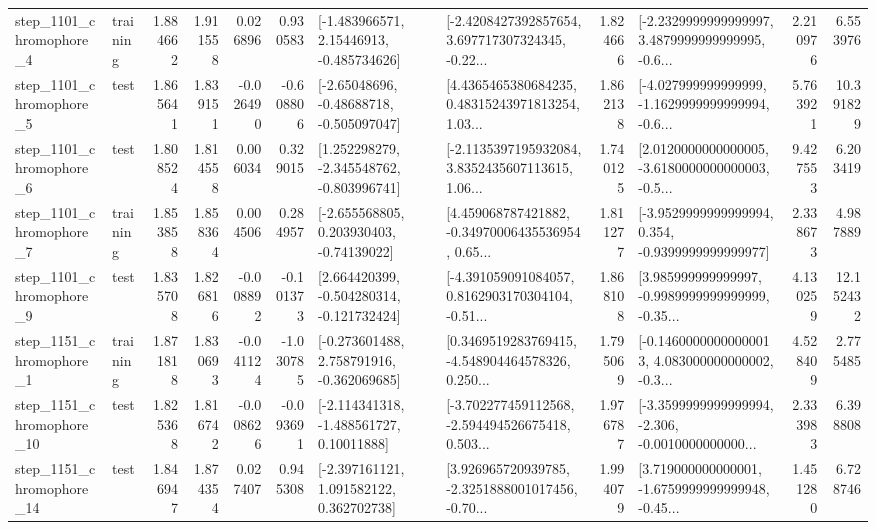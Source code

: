 \begin{tabular}{llrrrrllrlrr}
  step\_1101\_chromophore\_4 &  training &      1.884662 &    1.911558 &      0.026896 &  0.930583 &    [-1.483966571, 2.15446913, -0.485734626] &  [-2.4208427392857654, 3.697717307324345, -0.22... &       1.824666 &  [-2.2329999999999997, 3.4879999999999995, -0.6... &            2.210976 &          6.553976 \\
  step\_1101\_chromophore\_5 &      test &      1.865641 &    1.839151 &     -0.026490 & -0.608806 &    [-2.65048696, -0.48688718, -0.505097047] &  [4.4365465380684235, 0.48315243971813254, 1.03... &       1.862138 &  [-4.027999999999999, -1.1629999999999994, -0.6... &            5.763921 &         10.391829 \\
  step\_1101\_chromophore\_6 &      test &      1.808524 &    1.814558 &      0.006034 &  0.329015 &   [1.252298279, -2.345548762, -0.803996741] &  [-2.1135397195932084, 3.8352435607113615, 1.06... &       1.740125 &  [2.0120000000000005, -3.6180000000000003, -0.5... &            9.427553 &          6.203419 \\
  step\_1101\_chromophore\_7 &  training &      1.853858 &    1.858364 &      0.004506 &  0.284957 &    [-2.655568805, 0.203930403, -0.74139022] &  [4.459068787421882, -0.34970006435536954, 0.65... &       1.811277 &  [-3.9529999999999994, 0.354, -0.9399999999999977] &            2.338673 &          4.987889 \\
  step\_1101\_chromophore\_9 &      test &      1.835708 &    1.826816 &     -0.008892 & -0.101373 &   [2.664420399, -0.504280314, -0.121732424] &  [-4.391059091084057, 0.8162903170304104, -0.51... &       1.868108 &  [3.985999999999997, -0.9989999999999999, -0.35... &            4.130259 &         12.152432 \\
  step\_1151\_chromophore\_1 &  training &      1.871818 &    1.830693 &     -0.041124 & -1.030785 &   [-0.273601488, 2.758791916, -0.362069685] &  [0.3469519283769415, -4.548904464578326, 0.250... &       1.795069 &  [-0.14600000000000013, 4.083000000000002, -0.3... &            4.528409 &          2.775485 \\
 step\_1151\_chromophore\_10 &      test &      1.825368 &    1.816742 &     -0.008626 & -0.093691 &    [-2.114341318, -1.488561727, 0.10011888] &  [-3.702277459112568, -2.594494526675418, 0.503... &       1.976787 &  [-3.3599999999999994, -2.306, -0.0010000000000... &            2.333983 &          6.398808 \\
 step\_1151\_chromophore\_14 &      test &      1.846947 &    1.874354 &      0.027407 &  0.945308 &    [-2.397161121, 1.091582122, 0.362702738] &  [3.926965720939785, -2.3251888001017456, -0.70... &       1.994079 &  [3.719000000000001, -1.6759999999999948, -0.45... &            1.451280 &          6.728746 \\

\end{tabular}
